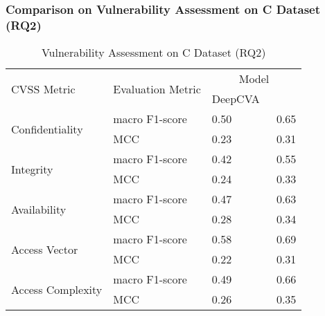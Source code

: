 \subsubsection{\bf Comparison on Vulnerability Assessment on C Dataset (RQ2)}




\begin{table}[t]
	\caption{Vulnerability Assessment on C Dataset (RQ2)}
        \vspace{-9pt}
	\begin{center}
                \small
		\renewcommand{\arraystretch}{1}
		\begin{tabular}{l|p{1.9cm}<{\centering}|p{1.5cm}<{\centering}|p{1.5cm}<{\centering}}
			\hline
			\multirow{2}{*}{CVSS Metric}     & \multirow{2}{*}{Evaluation Metric}  & \multicolumn{2}{c}{Model}\\
			\cline{3-4}
		                                     &                                     & DeepCVA~\cite{deepCVA-ase21}    & {\tool}       \\
		    \hline
			\multirow{2}{*}{Confidentiality} & macro F1-score                             &     0.50       & 0.65\\
			\cline{2-4}
			                                 & MCC                                 &      0.23      & 0.31\\
			\hline
			\multirow{2}{*}{Integrity}       & macro F1-score                             &    0.42        & 0.55\\
			\cline{2-4}
			                                 & MCC                                 &    0.24        & 0.33\\
			\hline
			\multirow{2}{*}{Availability}    & macro F1-score                             &   0.47         & 0.63\\
			\cline{2-4}
			                                 & MCC                                 &    0.28        & 0.34\\
			\hline
			\multirow{2}{*}{Access Vector}   & macro F1-score                             &   0.58         & 0.69\\
			\cline{2-4}
			                                 & MCC                                 &    0.22        & 0.31\\
			\hline
			\multirow{2}{*}{Access Complexity} & macro F1-score                           &   0.49         & 0.66\\
			\cline{2-4}
			                                 & MCC                                 &    0.26        & 0.35\\

\end{tabular}
\end{center}
\end{table}
